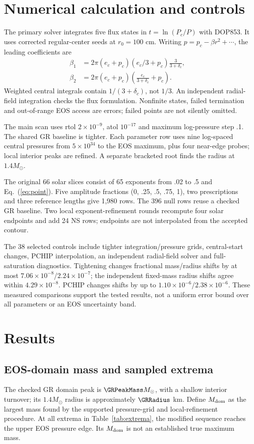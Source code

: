 \documentclass[twocolumn,prd,superscriptaddress,nofootinbib]{revtex4-2}
\begin{document}
\section{Numerical calculation and controls}
The primary solver integrates five flux states in $t=\ln(P_c/P)$ with
DOP853. It uses corrected regular-center seeds at $r_0=100$ cm.
Writing $p=p_c-\beta r^2+\cdots$, the leading coefficients are
\begin{align}
 \beta_1&=2\pi(e_c+p_c)(e_c/3+p_c)\frac{3}{3+\delta_c},\\
 \beta_2&=2\pi(e_c+p_c)\left(\frac{e_c}{3+\delta_c}+p_c\right).
\end{align}
Weighted central integrals contain $1/(3+\delta_c)$, not $1/3$.
An independent radial-field integration checks the flux formulation.
Nonfinite states, failed termination and out-of-range EOS access are
errors; failed points are not silently omitted.

The main scan uses rtol $2\times10^{-9}$, atol $10^{-17}$ and maximum
log-pressure step .1. The shared GR baseline is tighter. Each parameter
row uses nine log-spaced central pressures from $5\times10^{34}$ to the
EOS maximum, plus four near-edge probes; local interior peaks are refined.
A separate bracketed root finds the radius at $1.4M_\odot$.

The original 66 solar slices consist of 65 exponents from .02 to .5 and
Eq.~(\ref{eq:point}). Five amplitude fractions (0, .25, .5, .75, 1), two
prescriptions and three reference lengths give 1,980 rows. The 396 null
rows reuse a checked GR baseline. Two local exponent-refinement rounds
recompute four solar endpoints and add 24 NS rows; endpoints are not
interpolated from the accepted contour.

The 38 selected controls include tighter integration/pressure grids,
central-start changes, PCHIP interpolation, an independent radial-field
solver and full-saturation diagnostics. Tightening changes fractional
mass/radius shifts by at most $7.06\times10^{-8}$/$2.24\times10^{-7}$;
the independent fixed-mass radius shifts agree within $4.29\times10^{-8}$.
PCHIP changes shifts by up to $1.10\times10^{-6}$/$2.38\times10^{-6}$.
These measured comparisons support the tested results, not a uniform
error bound over all parameters or an EOS uncertainty band.

\section{Results}
\subsection{EOS-domain mass and sampled extrema}
The checked GR domain peak is $\GRPeakMass M_\odot$, with a shallow
interior turnover; its $1.4M_\odot$ radius is approximately
$\GRRadius$ km. Define $M_{\rm dom}$ as the largest mass found by the
supported pressure-grid and local-refinement procedure. At all extrema
in Table~\ref{tab:extrema}, the modified sequence reaches the upper EOS
pressure edge. Its $M_{\rm dom}$ is not an established true maximum mass.
\end{document}
